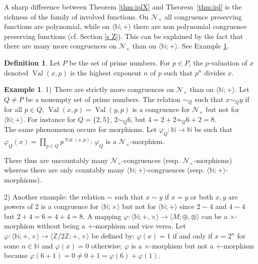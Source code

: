 \documentclass[11pt,a4paper]{article}
\theoremstyle{definition} %
\newtheorem{definition}[theorem]{Definition}
\newtheorem{example}[theorem]{Example}
\newtheorem{notation}[theorem]{Notation}
\newcommand\+[1]{\mathcal{#1}} %
\newcommand{\N}{{\mathbb N}}     %
\newcommand{\Z}{{\mathbb Z}}     %
\DeclareMathOperator{\val}{Val}%
\begin{document}
A sharp difference between Theorem \ref{thm:iplX} and Theorem~\ref{thm:ipl} 
is the richness of the family of involved  functions.  
 On  $\+N_\times$ all congruence preserving functions are polynomial, while on $\langle \N;+\rangle$ there are non polynomial
congruence preserving functions (cf. Section \ref{s Z}).
This can be explained by the fact that there are many more congruences on $\+N_\times$ than on $\langle \N;+\rangle$. See Example \ref{r:morphimes+xbis}.
%
\begin{definition} Let $P$ be the set of prime numbers.
For $p\in P$,  the  $p$-valuation of $x$ denoted $\val(x,p)$ is the
highest exponent $n$ of $p$ such that $p^n$ divides $x$.
\end{definition}
 \begin{example}\label{r:morphimes+xbis} 1) There are strictly more congruences on $\+N_\times$ 
than on  $\langle \N;+\rangle$. Let $Q\neq P$ be a nonempty set of prime numbers. The 
 relation $\sim_Q$ such that $x\sim_Q y$ if for all $p\in Q$, $\val(x,p)=\val(y,p)$
is a congruence for $\+N_\times$ but not for $\langle \N;+\rangle$.
For instance for $Q=\{2,5\}$, $2\sim_Q 6$, but $4=2+2\not\sim_Q  6+2=8$.
\\
 The same phenomenon occurs for morphisms. Let $\varphi_Q\colon\N\to \N$ be such that $\varphi_Q(x)=\prod_{p\in Q} p^{\val(x,p)}$: $\varphi_Q$ is a $\+N_\times$-morphism. 

There thus are uncountably many $\+N_\times$-congruences (resp. $\+N_\times$-morphisms)
whereas there are only countably many $\langle \N;+\rangle$-congruences (resp. $\langle \N;+\rangle$-morphisms).


2) Another example: the relation $\sim$ such that $x\sim y$ if $x=y$ or both $x,y$ are powers of $2$
is a congruence for $\langle \N;\times\rangle$ but not for $\langle \N;+\rangle$
since $2\sim 4$ and $4\sim 4$ but $2+4=6\not\sim 4+4=8$.
A mapping $\varphi\colon \langle \N;+,\times\rangle \to \langle M;\oplus,\otimes\rangle$
can be a $\times$-morphism without being a +-morphism and vice versa.
 Let $\varphi\colon\langle  \N ;+,\times\rangle\to \langle \Z/2\Z;+,\times\rangle$  be defined by: 
$\varphi(x) =1$ if and only if $x=2^n$ for some $n\in\N$ and $\varphi(x) =0$  otherwise; $\varphi$
is a  $\times$-morphism but not a  $+$-morphism because $\varphi(6+1)=0\not= 0+1=\varphi(6)+\varphi(1)$.
\end{example}
%
 
\end{document}
